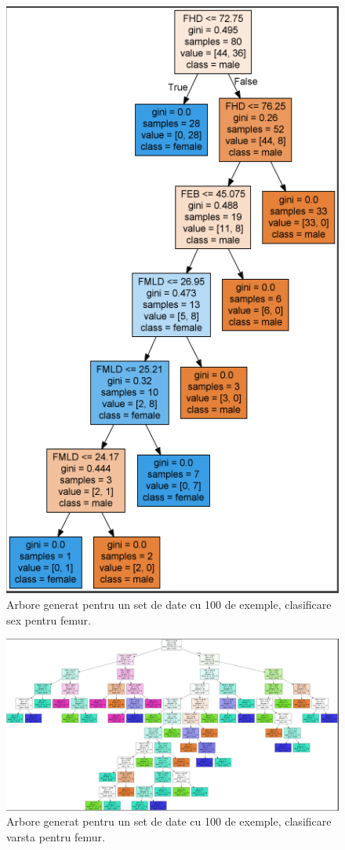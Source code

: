 \documentclass[runningheads,a4paper,11pt]{report}
\begin{document}
\begin{figure}
\centerline{\includegraphics{Imagini/tree_sex_femur_100.PNG}}
\caption{Arbore generat pentru un set de date cu 100 de exemple, clasificare sex pentru femur.}
\label{fig}
\end{figure}

\begin{figure}
\centerline{\includegraphics[width=20cm,keepaspectratio]{Imagini/tree_age_femur_100.png}}
\caption{Arbore generat pentru un set de date cu 100 de exemple, clasificare varsta pentru femur.}
\label{fig}
\end{figure}
\end{document}
